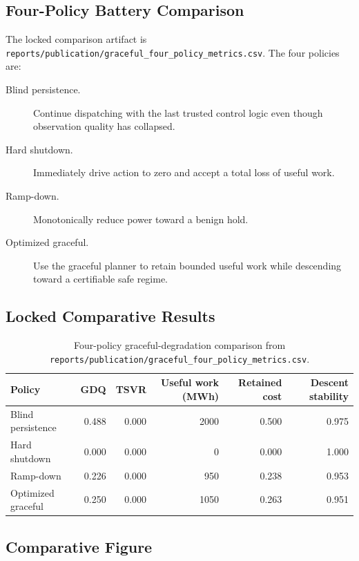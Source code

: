 \subsection{Four-Policy Battery Comparison}

The locked comparison artifact is
\texttt{reports/publication/graceful\_four\_policy\_metrics.csv}.  The four
policies are:

\begin{description}
  \item[Blind persistence.] Continue dispatching with the last trusted control
    logic even though observation quality has collapsed.
  \item[Hard shutdown.] Immediately drive action to zero and accept a total
    loss of useful work.
  \item[Ramp-down.] Monotonically reduce power toward a benign hold.
  \item[Optimized graceful.] Use the graceful planner to retain bounded useful
    work while descending toward a certifiable safe regime.
\end{description}

\subsection{Locked Comparative Results}

\begin{table}[ht]
\centering
\caption{Four-policy graceful-degradation comparison from
  \texttt{reports/publication/graceful\_four\_policy\_metrics.csv}.}
\label{tab:graceful-four-policy}
\begin{tabular}{lrrrrr}
\toprule
\textbf{Policy} & \textbf{GDQ} & \textbf{TSVR} & \textbf{Useful work (MWh)} &
  \textbf{Retained cost} & \textbf{Descent stability} \\
\midrule
Blind persistence & 0.488 & 0.000 & 2000 & 0.500 & 0.975 \\
Hard shutdown     & 0.000 & 0.000 &    0 & 0.000 & 1.000 \\
Ramp-down         & 0.226 & 0.000 &  950 & 0.238 & 0.953 \\
Optimized graceful& 0.250 & 0.000 & 1050 & 0.263 & 0.951 \\
\bottomrule
\end{tabular}
\end{table}

\subsection{Comparative Figure}

